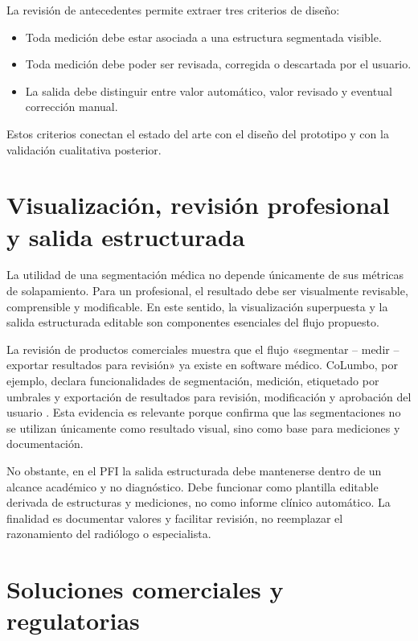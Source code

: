 La revisión de antecedentes permite extraer tres criterios de diseño:

\begin{itemize}
  \item Toda medición debe estar asociada a una estructura segmentada visible.
  \item Toda medición debe poder ser revisada, corregida o descartada por el usuario.
  \item La salida debe distinguir entre valor automático, valor revisado y eventual corrección manual.
\end{itemize}

Estos criterios conectan el estado del arte con el diseño del prototipo y con la validación cualitativa posterior.

\section{Visualización, revisión profesional y salida estructurada}

La utilidad de una segmentación médica no depende únicamente de sus métricas de solapamiento. Para un profesional, el resultado debe ser visualmente revisable, comprensible y modificable. En este sentido, la visualización superpuesta y la salida estructurada editable son componentes esenciales del flujo propuesto.

La revisión de productos comerciales muestra que el flujo «segmentar – medir – exportar resultados para revisión» ya existe en software médico. CoLumbo, por ejemplo, declara funcionalidades de segmentación, medición, etiquetado por umbrales y exportación de resultados para revisión, modificación y aprobación del usuario \parencite{fda_columbo_2022}. Esta evidencia es relevante porque confirma que las segmentaciones no se utilizan únicamente como resultado visual, sino como base para mediciones y documentación.

No obstante, en el PFI la salida estructurada debe mantenerse dentro de un alcance académico y no diagnóstico. Debe funcionar como plantilla editable derivada de estructuras y mediciones, no como informe clínico automático. La finalidad es documentar valores y facilitar revisión, no reemplazar el razonamiento del radiólogo o especialista.

\section{Soluciones comerciales y regulatorias}

